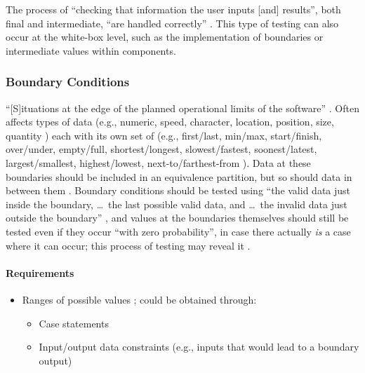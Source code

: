 The process of ``checking that information the user inputs [and] results'',
both final and intermediate, ``are handled correctly''
\citep[p.~70]{Patton2006}. This type of testing can also occur at the
white-box level, such as the implementation of boundaries
\citep[p.~431]{vanVliet2000} or intermediate values within
components.

\subsubsection[Boundary Conditions]{Boundary Conditions
      \citep[pp.~70-74]{Patton2006}}

``[S]ituations at the edge of the planned operational limits of the software''
\citep[p.~72]{Patton2006}. Often affects types of data (e.g., numeric,
speed, character, location, position, size, quantity
\citep[p.~72]{Patton2006}) each with its own set of (e.g., first/last,
min/max, start/finish, over/under, empty/full, shortest/longest,
slowest/fastest, soonest/latest, largest/smallest, highest/lowest,
next-to/farthest-from \citep[pp.~72-73]{Patton2006}). Data at these
boundaries should be included in an equivalence partition, but so should
data in between them \citep[p.~73]{Patton2006}. Boundary conditions
should be tested using ``the valid data just inside the boundary,
\dots\ the last possible valid data, and \dots\ the invalid data just outside the
boundary'' \citep[p.~73]{Patton2006}, and values at the boundaries
themselves should still be tested even if they occur ``with zero probability'',
in case there actually \emph{is} a case where it can occur; this process of
testing may reveal it \citep[p.~460]{PetersAndPedrycz2000}.

\paragraph{Requirements}
\begin{itemize}
      \item Ranges of possible values \citep[p.~67,~73]{Patton2006};
            could be obtained through:
            \begin{itemize}
                  \item Case statements
                  \item Input/output data constraints (e.g., inputs that
                        would lead to a boundary output)
            \end{itemize}
\end{itemize}

